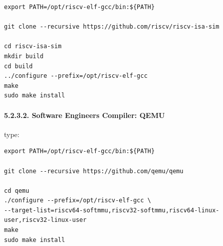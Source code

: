 \documentclass[]{article}
\let\oldparagraph\paragraph
\renewcommand{\paragraph}[1]{\oldparagraph{#1}\mbox{}}
\begin{document}
\begin{verbatim}
export PATH=/opt/riscv-elf-gcc/bin:${PATH}

git clone --recursive https://github.com/riscv/riscv-isa-sim

cd riscv-isa-sim
mkdir build
cd build
../configure --prefix=/opt/riscv-elf-gcc
make
sudo make install
\end{verbatim}

\paragraph{5.2.3.2. Software Engineers Compiler:
QEMU}\label{software-engineers-compiler-qemu}

type:

\begin{verbatim}
export PATH=/opt/riscv-elf-gcc/bin:${PATH}

git clone --recursive https://github.com/qemu/qemu

cd qemu
./configure --prefix=/opt/riscv-elf-gcc \
--target-list=riscv64-softmmu,riscv32-softmmu,riscv64-linux-user,riscv32-linux-user
make
sudo make install
\end{verbatim}
\end{document}
